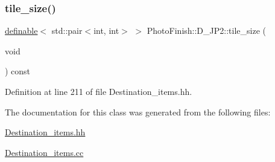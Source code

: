 \subsubsection{\texorpdfstring{tile\+\_\+size()}{tile\_size()}}
{\footnotesize\ttfamily \hyperlink{class_photo_finish_1_1definable}{definable}$<$ std\+::pair$<$int, int$>$ $>$ Photo\+Finish\+::\+D\+\_\+\+J\+P2\+::tile\+\_\+size (\begin{DoxyParamCaption}\item[{void}]{ }\end{DoxyParamCaption}) const\hspace{0.3cm}{\ttfamily [inline]}}



Definition at line 211 of file Destination\+\_\+items.\+hh.



The documentation for this class was generated from the following files\+:\begin{DoxyCompactItemize}
\item 
\hyperlink{_destination__items_8hh}{Destination\+\_\+items.\+hh}\item 
\hyperlink{_destination__items_8cc}{Destination\+\_\+items.\+cc}\end{DoxyCompactItemize}
